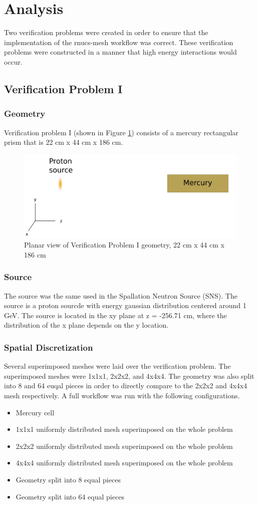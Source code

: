 \section{Analysis}\label{sc:analysis}
Two verification problems were created in order to ensure
that the implementation of the rnucs-mesh workflow was correct.
These verification problems were constructed in a manner that
high energy interactions would occur.

\subsection{Verification Problem I}
\subsubsection{Geometry}
Verification problem I (shown in Figure \ref{TPI}) consists of a mercury rectangular prism that is 
22 cm x 44 cm x 186 cm. 
%
\begin{figure}[h!]
\begin{centering}
\includegraphics[width=0.60\linewidth]{../figs/mercury.png}
\caption{Planar view of Verification Problem I geometry, 22 cm  x 44 cm x 186 cm }
\label{TPI}
\end{centering}
\end{figure}
%
\subsubsection{Source}
The source was the same used in the Spallation Neutron Source (SNS). The source
is a proton sourcde with energy gaussian distribution centered around 1 GeV.
The source is located in the xy plane at z = -256.71 cm, where the distribution
of the x plane depends on the y location.
%
\subsubsection{Spatial Discretization}
Several superimposed meshes were laid over the verification problem.
The superimposed meshes were 1x1x1, 2x2x2, and 4x4x4.
The geometry was also split into 8 and 64 euqal pieces in order to
directly compare to the 2x2x2 and 4x4x4 mesh respectively.
A full workflow was run with the following configurations.
\begin{itemize}
\item Mercury cell
\item 1x1x1 uniformly distributed mesh superimposed on the whole problem
\item 2x2x2 uniformly distributed mesh superimposed on the whole problem
\item 4x4x4 uniformly distributed mesh superimposed on the whole problem
\item Geometry split into 8 equal pieces
\item Geometry split into 64 equal pieces
\end{itemize}
